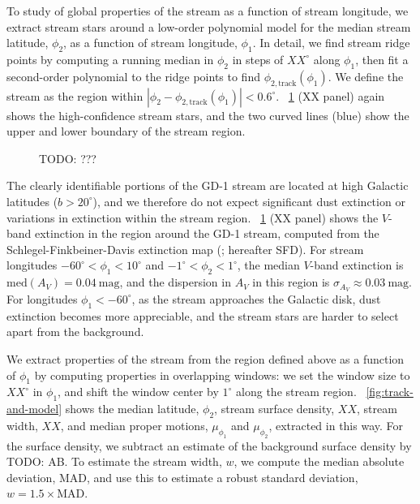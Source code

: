 \documentclass[modern]{aastex62}
\newcommand{\todo}[1]{{\color{red} TODO: #1}}
\begin{document}
To study of global properties of the stream as a function of stream longitude,
we extract stream stars around a low-order polynomial model for the median
stream latitude, $\phi_2$, as a function of stream longitude, $\phi_1$.
In detail, we find stream ridge points by computing a running median in $\phi_2$
in steps of $XX^\circ$ along $\phi_1$, then fit a second-order polynomial to the
ridge points to find $\phi_{2, \textrm{track}}(\phi_1)$.
We define the stream as the region within $\left| \phi_2 - \phi_{2,
\textrm{track}}(\phi_1) \right| < 0.6^\circ$.
\figurename~\ref{fig:XX} (XX panel) again shows the high-confidence
stream stars, and the two curved lines (blue) show the upper and lower boundary
of the stream region.

\begin{figure}[h]
\begin{center}
\end{center}
\caption{%
\todo{???}
\label{fig:XX}
}
\end{figure}

The clearly identifiable portions of the GD-1 stream are located at high
Galactic latitudes ($b > 20^\circ$), and we therefore do not expect significant
dust extinction or variations in extinction within the stream region.
\figurename~\ref{fig:XX} (XX panel) shows the $V$-band extinction
in the region around the GD-1 stream, computed from the
Schlegel-Finkbeiner-Davis extinction map (\cite{Schlegel:1998}; hereafter SFD).
For stream longitudes $-60^\circ < \phi_1 < 10^\circ$ and $-1^\circ < \phi_2 <
1^\circ$, the median $V$-band extinction is $\textrm{med}\left(A_V\right) =
0.04~\textrm{mag}$, and the dispersion in $A_V$ in this region is $\sigma_{A_V}
\approx 0.03~\textrm{mag}$.
For longitudes $\phi_1 < -60^\circ$, as the stream approaches the Galactic disk,
dust extinction becomes more appreciable, and the stream stars are harder to
select apart from the background.

We extract properties of the stream from the region defined above as a function
of $\phi_1$ by computing properties in overlapping windows:
we set the window size to $XX^\circ$ in $\phi_1$, and shift the window center by
$1^\circ$ along the stream region.
\figurename~\ref{fig:track-and-model} shows the median latitude, $\phi_2$,
stream surface density, $XX$, stream width, $XX$, and median proper motions,
$\mu_{\phi_1}$ and $\mu_{\phi_2}$, extracted in this way.
For the surface density, we subtract an estimate of the background surface
density by \todo{AB}.
To estimate the stream width, $w$, we compute the median absolute deviation,
$\textrm{MAD}$, and use this to estimate a robust standard deviation, $w = 1.5
\times \textrm{MAD}$.
\end{document}
